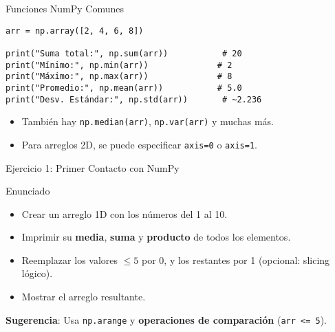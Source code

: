 \documentclass[10pt]{beamer}
\begin{document}
\begin{frame}[fragile]{Funciones NumPy Comunes}
\begin{verbatim}
arr = np.array([2, 4, 6, 8])

print("Suma total:", np.sum(arr))           # 20
print("Mínimo:", np.min(arr))              # 2
print("Máximo:", np.max(arr))              # 8
print("Promedio:", np.mean(arr))           # 5.0
print("Desv. Estándar:", np.std(arr))       # ~2.236
\end{verbatim}
\begin{itemize}
  \item También hay \texttt{np.median(arr)}, \texttt{np.var(arr)} y muchas más.
  \item Para arreglos 2D, se puede especificar \texttt{axis=0} o \texttt{axis=1}.
\end{itemize}
\end{frame}

\begin{frame}{Ejercicio 1: Primer Contacto con NumPy}
  \begin{block}{Enunciado}
    \begin{itemize}
      \item Crear un arreglo 1D con los números del 1 al 10.
      \item Imprimir su \textbf{media}, \textbf{suma} y \textbf{producto} de todos los elementos.
      \item Reemplazar los valores \(\leq 5\) por 0, y los restantes por 1 (opcional: slicing lógico).
      \item Mostrar el arreglo resultante.
    \end{itemize}
  \end{block}
  \textbf{Sugerencia}: Usa \texttt{np.arange} y \textbf{operaciones de comparación} (\texttt{arr <= 5}).
\end{frame}
\end{document}
